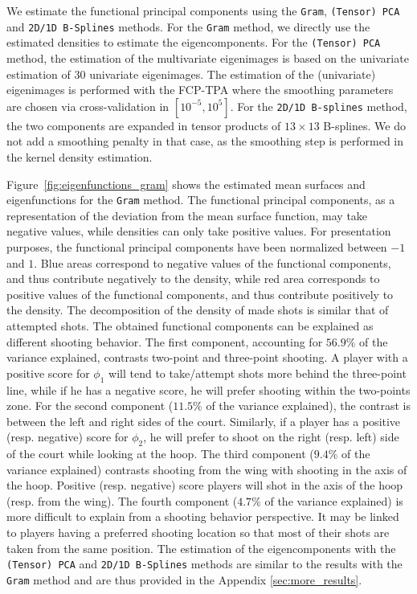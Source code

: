 We estimate the functional principal components using the \texttt{Gram}, \texttt{(Tensor) PCA} and \texttt{2D/1D B-Splines} methods. For the \texttt{Gram} method, we directly use the estimated densities to estimate the eigencomponents. For the \texttt{(Tensor) PCA} method, the estimation of the multivariate eigenimages is based on the univariate estimation of $30$ univariate eigenimages. The estimation of the (univariate) eigenimages is performed with the FCP-TPA where the smoothing parameters are chosen via cross-validation in $[10^{-5}, 10^5]$. For the \texttt{2D/1D B-splines} method, the two components are expanded in tensor products of $13 \times 13$ B-splines. We do not add a smoothing penalty in that case, as the smoothing step is performed in the kernel density estimation.

Figure~\ref{fig:eigenfunctions_gram} shows the estimated mean surfaces and eigenfunctions for the \texttt{Gram} method. The functional principal components, as a representation of the deviation from the mean surface function, may take negative values, while densities can only take positive values. For presentation purposes, the functional principal components have been normalized between $-1$ and $1$. Blue areas correspond to negative values of the functional components, and thus contribute negatively to the density, while red area corresponds to positive values of the functional components, and thus contribute positively to the density. The decomposition of the density of made shots is similar that of attempted shots. The obtained functional components can be explained as different shooting behavior. The first component, accounting for $56.9\%$ of the variance explained, contrasts two-point and three-point shooting. A player with a positive score for $\phi_1$ will tend to take/attempt shots more behind the three-point line, while if he has a negative score, he will prefer shooting within the two-points zone. For the second component ($11.5\%$ of the variance explained), the contrast is between the left and right sides of the court. Similarly, if a player has a positive (resp. negative) score for $\phi_2$, he will prefer to shoot on the right (resp. left) side of the court while looking at the hoop. The third component ($9.4\%$ of the variance explained) contrasts shooting from the wing with shooting in the axis of the hoop. Positive (resp. negative) score players will shot in the axis of the hoop (resp. from the wing). The fourth component ($4.7\%$ of the variance explained) is more difficult to explain from a shooting behavior perspective. It may be linked to players having a preferred shooting location so that most of their shots are taken from the same position. The estimation of the eigencomponents with the \texttt{(Tensor) PCA} and \texttt{2D/1D B-Splines} methods are similar to the results with the \texttt{Gram} method and are thus provided in the Appendix \ref{sec:more_results}. 
